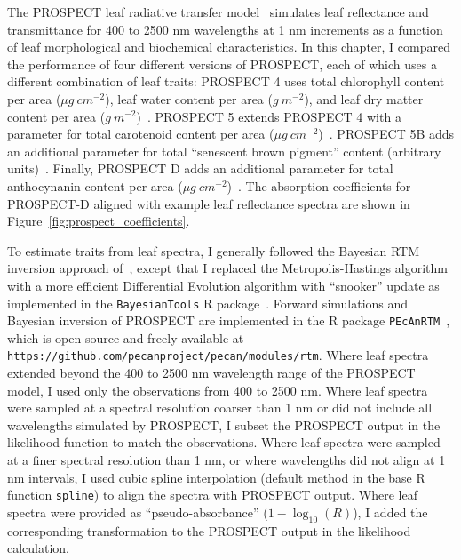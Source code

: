 The PROSPECT leaf radiative transfer model~\cite{jacquemoud_1990_prospect,jacquemoud_2009_prosail,feret_2008_prospect,feret_2017_prospectd} simulates leaf reflectance and transmittance for 400 to 2500 nm wavelengths at 1 nm increments as a function of leaf morphological and biochemical characteristics.
In this chapter, I compared the performance of four different versions of PROSPECT, each of which uses a different combination of leaf traits:
PROSPECT 4 uses
total chlorophyll content per area ($\mu g~cm^{-2}$),
leaf water content per area ($g~m^{-2}$),
and leaf dry matter content per area ($g~m^{-2}$)~\cite{feret_2008_prospect}.
PROSPECT 5 extends PROSPECT 4 with a parameter for
total carotenoid content per area ($\mu g~cm^{-2}$)~\cite{feret_2008_prospect}.
PROSPECT 5B adds an additional parameter for
total ``senescent brown pigment'' content (arbitrary units)~\cite{jacquemoud_2009_prosail}.
Finally, PROSPECT D adds an additional parameter for
total anthocynanin content per area ($\mu g~cm^{-2}$)~\cite{feret_2017_prospectd}.
The absorption coefficients for PROSPECT-D aligned with example leaf reflectance spectra are shown in Figure~\ref{fig:prospect_coefficients}.

To estimate traits from leaf spectra, I generally followed the Bayesian RTM inversion approach of~\cite{shiklomanov2016_rse}, except that I replaced the Metropolis-Hastings algorithm with a more efficient Differential Evolution algorithm with ``snooker'' update as implemented in the \texttt{BayesianTools} R package~\cite{bayesiantools}.
Forward simulations and Bayesian inversion of PROSPECT are implemented in the R package \texttt{PEcAnRTM}~\cite{shiklomanov2016_rse}, which is open source and freely available at \texttt{https://github.com/pecanproject/pecan/modules/rtm}.
Where leaf spectra extended beyond the 400 to 2500 nm wavelength range of the PROSPECT model, I used only the observations from 400 to 2500 nm.
Where leaf spectra were sampled at a spectral resolution coarser than 1 nm or did not include all wavelengths simulated by PROSPECT, I subset the PROSPECT output in the likelihood function to match the observations.
Where leaf spectra were sampled at a finer spectral resolution than 1 nm, or where wavelengths did not align at 1 nm intervals, I used cubic spline interpolation (default method in the base R function \texttt{spline}) to align the spectra with PROSPECT output.
Where leaf spectra were provided as ``pseudo-absorbance'' ($1 - \log_{10}(R)$), I added the corresponding transformation to the PROSPECT output in the likelihood calculation. 

